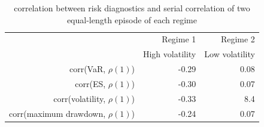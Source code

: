 \documentclass[12pt]{article}
\begin{document}
\begin{table}[!h]
\caption{correlation between risk diagnostics and serial correlation of two equal-length episode of each regime} 
\centering 
\begin{tabular}{| r | r | r |} 
 \hline
& Regime 1 & Regime 2 \\
& High volatility & Low volatility \\
 \hline 
corr(VaR, $\rho(1)$)  & -0.29 & 0.08 \\
corr(ES, $\rho(1)$)   & -0.30 & 0.07 \\
corr(volatility, $\rho(1)$)  & -0.33 & 8.4 \\
corr(maximum drawdown, $\rho(1)$)  & -0.24 & 0.07 \\
 \hline
\end{tabular}
\label{table:corr_risk_serial_regime}
\end{table}

\iffalse
\end{document}
